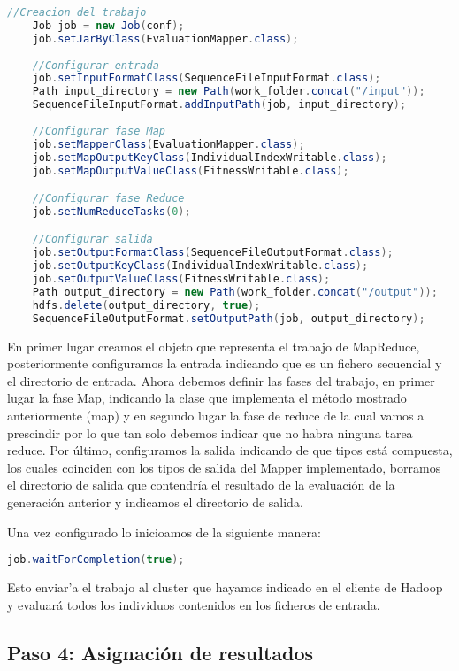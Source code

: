 \begin{lstlisting}[language=Java]
	//Creacion del trabajo
	Job job = new Job(conf);
	job.setJarByClass(EvaluationMapper.class);
	
	//Configurar entrada
	job.setInputFormatClass(SequenceFileInputFormat.class);
	Path input_directory = new Path(work_folder.concat("/input"));
	SequenceFileInputFormat.addInputPath(job, input_directory);
	
	//Configurar fase Map
	job.setMapperClass(EvaluationMapper.class);
	job.setMapOutputKeyClass(IndividualIndexWritable.class);
	job.setMapOutputValueClass(FitnessWritable.class);

	//Configurar fase Reduce
	job.setNumReduceTasks(0);

	//Configurar salida
	job.setOutputFormatClass(SequenceFileOutputFormat.class);
	job.setOutputKeyClass(IndividualIndexWritable.class);
	job.setOutputValueClass(FitnessWritable.class);
	Path output_directory = new Path(work_folder.concat("/output"));
	hdfs.delete(output_directory, true);
	SequenceFileOutputFormat.setOutputPath(job, output_directory);
\end{lstlisting}

En primer lugar creamos el objeto que representa el trabajo de MapReduce, posteriormente configuramos la entrada indicando que es un fichero secuencial y el directorio de entrada. Ahora debemos definir las fases del trabajo, en primer lugar la fase Map, indicando la clase que implementa el método mostrado anteriormente (map) y en segundo lugar la fase de reduce de la cual vamos a prescindir por lo que tan solo debemos indicar que no habra ninguna tarea reduce. Por \'ultimo, configuramos la salida indicando de que tipos est\'a compuesta, los cuales coinciden con los tipos de salida del Mapper implementado, borramos el directorio de salida que contendría el resultado de la evaluación de la generación anterior y indicamos el directorio de salida.

Una vez configurado lo inicioamos de la siguiente manera:

\begin{lstlisting}[language=Java]
	job.waitForCompletion(true);
\end{lstlisting}

Esto enviar'a el trabajo al cluster que hayamos indicado en el cliente de Hadoop y evaluar\'a todos los individuos contenidos en los ficheros de entrada.

\subsection{Paso 4: Asignaci\'on de resultados}

